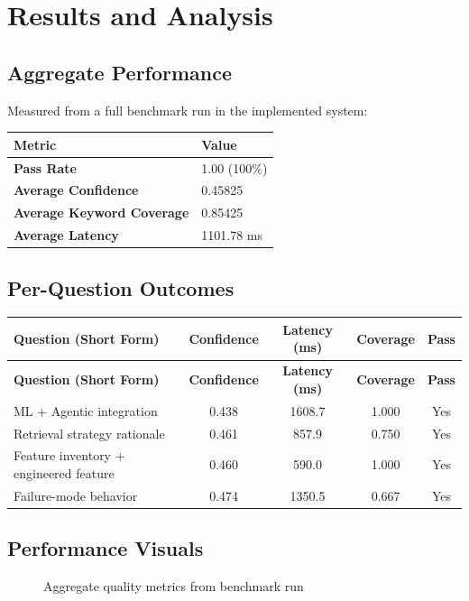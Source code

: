 \documentclass[12pt,a4paper]{article}
\begin{document}
\section{Results and Analysis}
\subsection{Aggregate Performance}
Measured from a full benchmark run in the implemented system:

\begin{tabularx}{\linewidth}{@{}>{\bfseries}lX@{}}
\toprule
Metric & Value \\
\midrule
Pass Rate & 1.00 (100\%) \\
Average Confidence & 0.45825 \\
Average Keyword Coverage & 0.85425 \\
Average Latency & 1101.78 ms \\
\bottomrule
\end{tabularx}

\subsection{Per-Question Outcomes}
\begin{longtable}{@{}p{5.6cm}cccc@{}}
\toprule
\textbf{Question (Short Form)} & \textbf{Confidence} & \textbf{Latency (ms)} & \textbf{Coverage} & \textbf{Pass} \\
\midrule
\endfirsthead
\toprule
\textbf{Question (Short Form)} & \textbf{Confidence} & \textbf{Latency (ms)} & \textbf{Coverage} & \textbf{Pass} \\
\midrule
\endhead
ML + Agentic integration & 0.438 & 1608.7 & 1.000 & Yes \\
Retrieval strategy rationale & 0.461 & 857.9 & 0.750 & Yes \\
Feature inventory + engineered feature & 0.460 & 590.0 & 1.000 & Yes \\
Failure-mode behavior & 0.474 & 1350.5 & 0.667 & Yes \\
\bottomrule
\end{longtable}

\subsection{Performance Visuals}
\begin{figure}[H]
\centering
{}
\caption{Aggregate quality metrics from benchmark run}
\label{fig:quality}
\end{figure}
\end{document}

